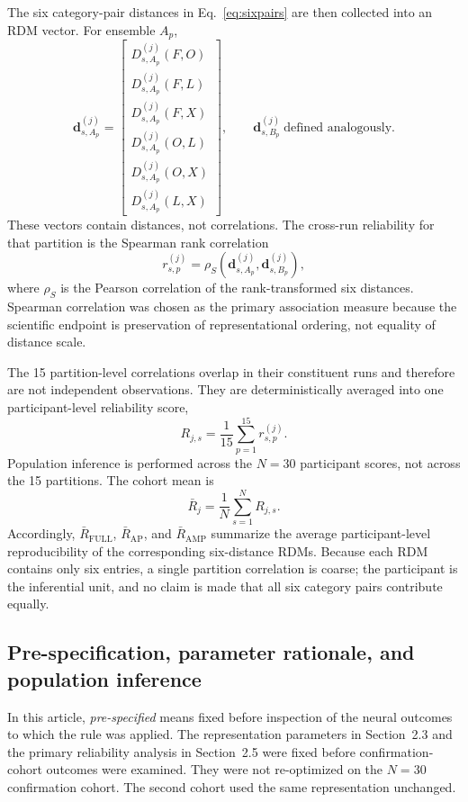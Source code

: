 \documentclass[11pt]{article}
\begin{document}
The six category-pair distances in Eq.~\ref{eq:sixpairs} are then collected into an RDM vector. For ensemble $A_p$,
\begin{equation}
\bm d^{(j)}_{s,A_p}=\begin{bmatrix}
D^{(j)}_{s,A_p}(F,O)\\
D^{(j)}_{s,A_p}(F,L)\\
D^{(j)}_{s,A_p}(F,X)\\
D^{(j)}_{s,A_p}(O,L)\\
D^{(j)}_{s,A_p}(O,X)\\
D^{(j)}_{s,A_p}(L,X)
\end{bmatrix},
\qquad
\bm d^{(j)}_{s,B_p}\ \text{defined analogously}.
\label{eq:rdmvector}
\end{equation}
These vectors contain distances, not correlations. The cross-run reliability for that partition is the Spearman rank correlation
\begin{equation}
r^{(j)}_{s,p}=\rho_S\!\left(\bm d^{(j)}_{s,A_p},\bm d^{(j)}_{s,B_p}\right),
\label{eq:partitionr}
\end{equation}
where $\rho_S$ is the Pearson correlation of the rank-transformed six distances. Spearman correlation was chosen as the primary association measure because the scientific endpoint is preservation of representational ordering, not equality of distance scale.

The 15 partition-level correlations overlap in their constituent runs and therefore are not independent observations. They are deterministically averaged into one participant-level reliability score,
\begin{equation}
R_{j,s}=\frac{1}{15}\sum_{p=1}^{15}r^{(j)}_{s,p}.
\label{eq:Rparticipant}
\end{equation}
Population inference is performed across the $N=30$ participant scores, not across the 15 partitions. The cohort mean is
\begin{equation}
\bar R_j=\frac{1}{N}\sum_{s=1}^{N}R_{j,s}.
\label{eq:Rgroup}
\end{equation}
Accordingly, $\bar R_{\mathrm{FULL}}$, $\bar R_{\mathrm{AP}}$, and $\bar R_{\mathrm{AMP}}$ summarize the average participant-level reproducibility of the corresponding six-distance RDMs. Because each RDM contains only six entries, a single partition correlation is coarse; the participant is the inferential unit, and no claim is made that all six category pairs contribute equally.

\subsection{Pre-specification, parameter rationale, and population inference}
In this article, \emph{pre-specified} means fixed before inspection of the neural outcomes to which the rule was applied. The representation parameters in Section~2.3 and the primary reliability analysis in Section~2.5 were fixed before confirmation-cohort outcomes were examined. They were not re-optimized on the $N=30$ confirmation cohort. The second cohort used the same representation unchanged.
\end{document}
